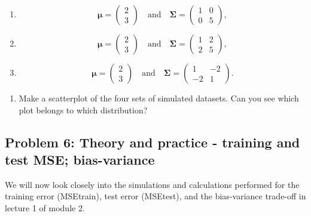 \documentclass[]{article}
\providecommand{\tightlist}{%
  \setlength{\itemsep}{0pt}\setlength{\parskip}{0pt}}
\begin{document}
\begin{enumerate}
\def\labelenumi{\roman{enumi})}
\setcounter{enumi}{1}
\item
  \[ \boldsymbol{\mu} = \begin{pmatrix}
  2 \\
  3 
  \end{pmatrix} \quad \text{and} \quad \boldsymbol{\Sigma} = \begin{pmatrix}
  1 & 0\\
  0 & 5
  \end{pmatrix},\]
\item
  \[ \boldsymbol{\mu} = \begin{pmatrix}
  2 \\
  3 
  \end{pmatrix} \quad \text{and} \quad \boldsymbol{\Sigma} = \begin{pmatrix}
  1 & 2\\
  2 & 5
  \end{pmatrix},\]
\item
  \[ \boldsymbol{\mu} = \begin{pmatrix}
  2 \\
  3 
  \end{pmatrix} \quad \text{and} \quad \boldsymbol{\Sigma} = \begin{pmatrix}
  1 & -2\\
  -2 & 1
  \end{pmatrix}.\]
\end{enumerate}

\begin{enumerate}
\def\labelenumi{\alph{enumi})}
\setcounter{enumi}{1}
\tightlist
\item
  Make a scatterplot of the four sets of simulated datasets. Can you see
  which plot belongs to which distribution?
\end{enumerate}

\normalsize
\clearpage

\subsection{Problem 6: Theory and practice - training and test MSE;
bias-variance}\label{problem-6-theory-and-practice---training-and-test-mse-bias-variance}

We will now look closely into the simulations and calculations performed
for the training error (MSEtrain), test error (MSEtest), and the
bias-variance trade-off in lecture 1 of module 2.
\end{document}

